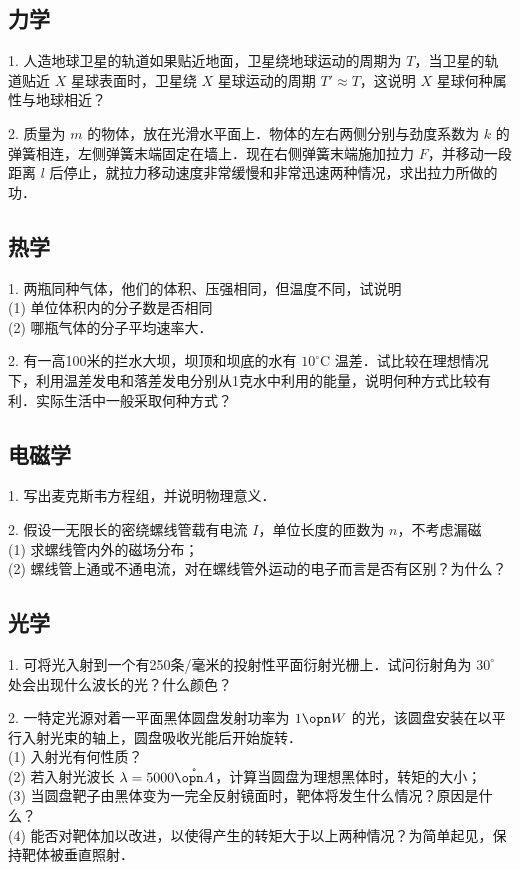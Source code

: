\subsection{力学}
1. 人造地球卫星的轨道如果贴近地面，卫星绕地球运动的周期为 $T$，当卫星的轨道贴近 $X$ 星球表面时，卫星绕 $X$ 星球运动的周期 $T' \approx T$，这说明 $X$ 星球何种属性与地球相近？

2. 质量为 $m$ 的物体，放在光滑水平面上．物体的左右两侧分别与劲度系数为 $k$ 的弹簧相连，左侧弹簧末端固定在墙上．现在右侧弹簧末端施加拉力 $F$，并移动一段距离 $l$ 后停止，就拉力移动速度非常缓慢和非常迅速两种情况，求出拉力所做的功．
\subsection{热学}
1. 两瓶同种气体，他们的体积、压强相同，但温度不同，试说明\\
(1) 单位体积内的分子数是否相同\\
(2) 哪瓶气体的分子平均速率大．

2. 有一高100米的拦水大坝，坝顶和坝底的水有 $10^\circ\mathrm{C}$ 温差．试比较在理想情况下，利用温差发电和落差发电分别从1克水中利用的能量，说明何种方式比较有利．实际生活中一般采取何种方式？
\subsection{电磁学}
1. 写出麦克斯韦方程组，并说明物理意义．

2. 假设一无限长的密绕螺线管载有电流 $I$，单位长度的匝数为 $n$，不考虑漏磁\\
(1) 求螺线管内外的磁场分布；\\
(2) 螺线管上通或不通电流，对在螺线管外运动的电子而言是否有区别？为什么？
\subsection{光学}
1. 可将光入射到一个有250条/毫米的投射性平面衍射光栅上．试问衍射角为 $30^\circ$ 处会出现什么波长的光？什么颜色？

2. 一特定光源对着一平面黑体圆盘发射功率为 $1\opn W$ 的光，该圆盘安装在以平行入射光束的轴上，圆盘吸收光能后开始旋转．\\
(1) 入射光有何性质？\\
(2) 若入射光波长 $\lambda=5000 \mathring{\opn A}$，计算当圆盘为理想黑体时，转矩的大小；\\
(3) 当圆盘靶子由黑体变为一完全反射镜面时，靶体将发生什么情况？原因是什么？\\
(4) 能否对靶体加以改进，以使得产生的转矩大于以上两种情况？为简单起见，保持靶体被垂直照射．
